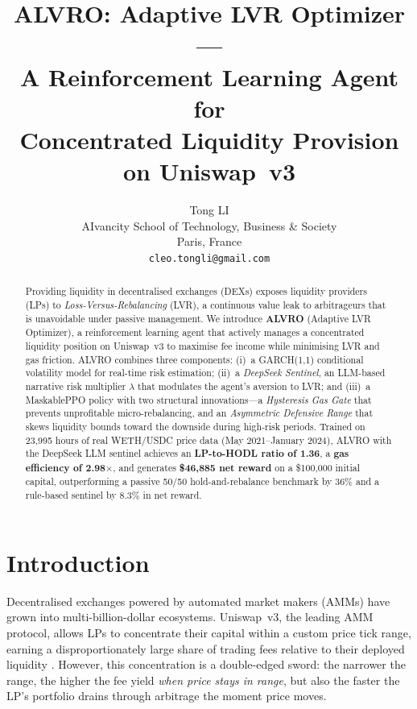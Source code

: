 \documentclass{article}
\title{ALVRO: Adaptive LVR Optimizer ---\\
A Reinforcement Learning Agent for\\
Concentrated Liquidity Provision on Uniswap~v3}
\author{%
  Tong LI \\
  AIvancity School of Technology, Business \& Society \\
  Paris, France \\
  \texttt{cleo.tongli@gmail.com} \\
}
\begin{document}
\maketitle

\begin{abstract}
Providing liquidity in decentralised exchanges (DEXs) exposes liquidity
providers (LPs) to \emph{Loss-Versus-Rebalancing} (LVR), a continuous value
leak to arbitrageurs that is unavoidable under passive management.  We
introduce \textbf{ALVRO} (Adaptive LVR Optimizer), a reinforcement learning
agent that actively manages a concentrated liquidity position on Uniswap~v3
to maximise fee income while minimising LVR and gas friction.  ALVRO combines
three components: (i)~a GARCH(1,1) conditional volatility model for real-time
risk estimation; (ii)~a \emph{DeepSeek Sentinel}, an LLM-based narrative risk
multiplier $\lambda$ that modulates the agent's aversion to LVR; and
(iii)~a MaskablePPO policy with two structural innovations---a
\emph{Hysteresis Gas Gate} that prevents unprofitable micro-rebalancing, and
an \emph{Asymmetric Defensive Range} that skews liquidity bounds toward the
downside during high-risk periods.  Trained on 23{,}995 hours of real
WETH/USDC price data (May 2021--January 2024), ALVRO with the DeepSeek LLM
sentinel achieves an \textbf{LP-to-HODL ratio of 1.36}, a
\textbf{gas efficiency of 2.98$\times$}, and generates
\textbf{\$46{,}885 net reward} on a \$100{,}000 initial capital,
outperforming a passive 50/50 hold-and-rebalance benchmark by 36\% and
a rule-based sentinel by 8.3\% in net reward.
\end{abstract}

\section{Introduction}

Decentralised exchanges powered by automated market makers (AMMs) have grown
into multi-billion-dollar ecosystems.  Uniswap~v3, the leading AMM protocol,
allows LPs to concentrate their capital within a custom price tick range,
earning a disproportionately large share of trading fees relative to their
deployed liquidity \citep{uniswapv3whitepaper}.  However, this concentration
is a double-edged sword: the narrower the range, the higher the fee yield
\emph{when price stays in range}, but also the faster the LP's portfolio
drains through arbitrage the moment price moves.
\end{document}
